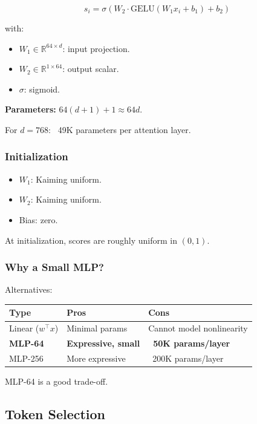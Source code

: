 \[
s_i = \sigma\!\left(W_2 \cdot \text{GELU}(W_1 x_i + b_1) + b_2\right)
\tag{4.1}
\]

with:
\begin{itemize}
\item $W_1 \in \mathbb{R}^{64 \times d}$: input projection.
\item $W_2 \in \mathbb{R}^{1 \times 64}$: output scalar.
\item $\sigma$: sigmoid.

\end{itemize}
\textbf{Parameters:} $64 (d + 1) + 1 \approx 64 d$.

For $d = 768$: ~49K parameters per attention layer.

\subsubsection{Initialization}

\begin{itemize}
\item $W_1$: Kaiming uniform.
\item $W_2$: Kaiming uniform.
\item Bias: zero.

\end{itemize}
At initialization, scores are roughly uniform in $(0, 1)$.

\subsubsection{Why a Small MLP?}

Alternatives:

\begin{table}[H]
\centering
\small
\begin{tabular}{lll}
\toprule
\textbf{Type} & \textbf{Pros} & \textbf{Cons} \\
\midrule
Linear ($w^\top x$) & Minimal params & Cannot model nonlinearity \\
\textbf{MLP-64} & \textbf{Expressive, small} & \textbf{~50K params/layer} \\
MLP-256 & More expressive & ~200K params/layer \\
\bottomrule
\end{tabular}
\end{table}

MLP-64 is a good trade-off.

\subsection{Token Selection}

